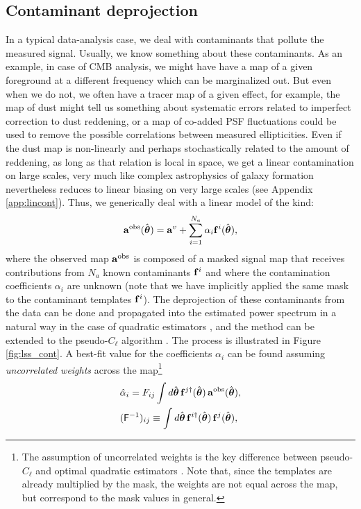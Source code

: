 \documentclass[usenatbib]{mnrasb}
\newcommand{\nv}{\hat{\boldsymbol{\theta}}}
\begin{document}
    \subsection{Contaminant deprojection}\label{ssec:maths.deproj}
      In a typical data-analysis case, we deal with contaminants that pollute the measured signal. Usually, we know something about these contaminants. As an example, in case of CMB analysis, we might have have a map of a given foreground at a different frequency which can be marginalized out. But even when we do not, we often have a tracer map of a given effect, for example, the map of dust might tell us something about systematic errors related to imperfect correction to dust reddening, or a map of co-added PSF fluctuations could be used to remove the possible correlations between measured ellipticities. Even if the dust map is non-linearly and perhaps stochastically related to the amount of reddening, as long as that relation is local in space, we get a linear contamination on large scales, very much like complex astrophysics of galaxy formation nevertheless reduces to linear biasing on very large scales (see Appendix \ref{app:lincont}). Thus, we generically deal with a linear model of the kind:
      \begin{equation}\label{eq:aobs}
        {\bf a}^{\rm obs}(\nv)={\bf a}^v+\sum_{i=1}^{N_a}\alpha_i{\bf f}^i(\nv),
      \end{equation}
      where the observed map ${\bf a}^{\rm obs}$ is composed of a masked signal map that receives contributions from $N_a$ known contaminants ${\bf f}^i$ and where the contamination coefficients $\alpha_i$ are unknown (note that we have implicitly applied the same mask to the contaminant templates ${\bf f}^i$). The deprojection of these contaminants from the data can be done and propagated into the estimated power spectrum in a natural way in the case of quadratic estimators \citep{1992ApJ...398..169R,2004PhRvD..69l3003S,2016MNRAS.456.2095E}, and the method can be extended to the pseudo-$C_\ell$ algorithm \citep{2017MNRAS.465.1847E}. The process is illustrated in Figure \ref{fig:lss_cont}. A best-fit value for the coefficients $\alpha_i$ can be found assuming \emph{uncorrelated weights} across the map\footnote{The assumption of uncorrelated weights is the key difference between pseudo-$C_\ell$ and optimal quadratic estimators \citep{2013MNRAS.435.1857L}. Note that, since the templates are already multiplied by the mask, the weights are not equal across the map, but correspond to the mask values in general.}
      \begin{align}\label{eq:deproj_coeff}
        &\hat{\alpha}_i=F_{ij}\int d\nv\,{\bf f}^{j\dag}(\nv)\,{\bf a}^{\rm obs}(\nv),\\\nonumber
        &({\sf F}^{-1})_{ij}\equiv\int d\nv\, {\bf f}^{i\dag}(\nv)\,{\bf f}^j(\nv),
      \end{align}
\end{document}
